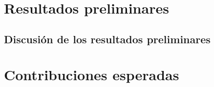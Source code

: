 \documentclass[12pt,a4paper]{report}
\begin{document}
\chapter{Resultados preliminares}

%
%
%
%


\section{Discusión de los resultados preliminares}

%
%
%
%



\chapter{Contribuciones esperadas}

%
%
%
%
%
%
%
%
%
%


\end{document}
